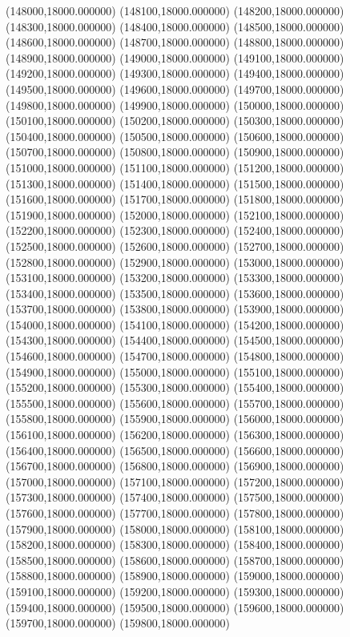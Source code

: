 (148000,18000.000000)
(148100,18000.000000)
(148200,18000.000000)
(148300,18000.000000)
(148400,18000.000000)
(148500,18000.000000)
(148600,18000.000000)
(148700,18000.000000)
(148800,18000.000000)
(148900,18000.000000)
(149000,18000.000000)
(149100,18000.000000)
(149200,18000.000000)
(149300,18000.000000)
(149400,18000.000000)
(149500,18000.000000)
(149600,18000.000000)
(149700,18000.000000)
(149800,18000.000000)
(149900,18000.000000)
(150000,18000.000000)
(150100,18000.000000)
(150200,18000.000000)
(150300,18000.000000)
(150400,18000.000000)
(150500,18000.000000)
(150600,18000.000000)
(150700,18000.000000)
(150800,18000.000000)
(150900,18000.000000)
(151000,18000.000000)
(151100,18000.000000)
(151200,18000.000000)
(151300,18000.000000)
(151400,18000.000000)
(151500,18000.000000)
(151600,18000.000000)
(151700,18000.000000)
(151800,18000.000000)
(151900,18000.000000)
(152000,18000.000000)
(152100,18000.000000)
(152200,18000.000000)
(152300,18000.000000)
(152400,18000.000000)
(152500,18000.000000)
(152600,18000.000000)
(152700,18000.000000)
(152800,18000.000000)
(152900,18000.000000)
(153000,18000.000000)
(153100,18000.000000)
(153200,18000.000000)
(153300,18000.000000)
(153400,18000.000000)
(153500,18000.000000)
(153600,18000.000000)
(153700,18000.000000)
(153800,18000.000000)
(153900,18000.000000)
(154000,18000.000000)
(154100,18000.000000)
(154200,18000.000000)
(154300,18000.000000)
(154400,18000.000000)
(154500,18000.000000)
(154600,18000.000000)
(154700,18000.000000)
(154800,18000.000000)
(154900,18000.000000)
(155000,18000.000000)
(155100,18000.000000)
(155200,18000.000000)
(155300,18000.000000)
(155400,18000.000000)
(155500,18000.000000)
(155600,18000.000000)
(155700,18000.000000)
(155800,18000.000000)
(155900,18000.000000)
(156000,18000.000000)
(156100,18000.000000)
(156200,18000.000000)
(156300,18000.000000)
(156400,18000.000000)
(156500,18000.000000)
(156600,18000.000000)
(156700,18000.000000)
(156800,18000.000000)
(156900,18000.000000)
(157000,18000.000000)
(157100,18000.000000)
(157200,18000.000000)
(157300,18000.000000)
(157400,18000.000000)
(157500,18000.000000)
(157600,18000.000000)
(157700,18000.000000)
(157800,18000.000000)
(157900,18000.000000)
(158000,18000.000000)
(158100,18000.000000)
(158200,18000.000000)
(158300,18000.000000)
(158400,18000.000000)
(158500,18000.000000)
(158600,18000.000000)
(158700,18000.000000)
(158800,18000.000000)
(158900,18000.000000)
(159000,18000.000000)
(159100,18000.000000)
(159200,18000.000000)
(159300,18000.000000)
(159400,18000.000000)
(159500,18000.000000)
(159600,18000.000000)
(159700,18000.000000)
(159800,18000.000000)
